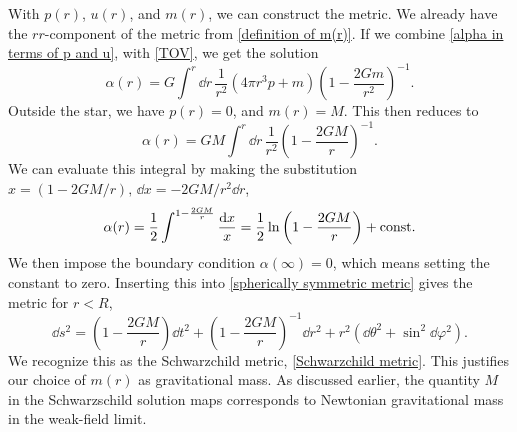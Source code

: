 With $p(r)$, $u(r)$, and $m(r)$, we can construct the metric.
We already have the $rr$-component of the metric from \autoref{definition of m(r)}.
If we combine \autoref{alpha in terms of p and u}, with \autoref{TOV}, we get the solution
%
\begin{equation}
    \label{solution to alpha}
    \alpha(r) = G \int^r \dd r \, \frac{1}{r^2} (4 \pi r^3 p + m)
    \left(1 - \frac{2 G m}{r^2} \right)^{-1}.
\end{equation}
%
Outside the star, we have $p(r) = 0$, and $m(r) = M$.
This then reduces to
%
\begin{equation}
    \alpha(r) = G M \int^r \dd r \, \frac{1}{r^2} \left(1 - \frac{2 G M}{r}\right)^{-1}.
\end{equation}
%
We can evaluate this integral by making the substitution $x = (1 - 2GM/r), \, \dd x = - 2GM/r^2 \dd r$,
%
\begin{equation}
    \alpha(r) = \frac{1}{2} \int^{1-\frac{2GM}{r}} \frac{\text{d} x}{x}
    = \frac{1}{2} \ln \left(1 - \frac{2GM}{r}\right) + \mathrm{const.}
\end{equation}
%
We then impose the boundary condition $\alpha(\infty) = 0$, which means setting the constant to zero.
Inserting this into \autoref{spherically symmetric metric} gives the metric for $r<R$,
%
\begin{equation}
    \dd s^2
    =
    \left(1 - \frac{2GM}{r}\right) \dd t^2
    + \left(1 - \frac{2 G M}{r}\right)^{-1} \dd r^2
    + r^2 \left(\dd \theta^2 + \sin^2\dd\varphi^2\right).
\end{equation}
%
We recognize this as the Schwarzchild metric, \autoref{Schwarzchild metric}.
This justifies our choice of $m(r)$ as gravitational mass.
As discussed earlier, the quantity $M$ in the Schwarzschild solution maps corresponds to Newtonian gravitational mass in the weak-field limit.


